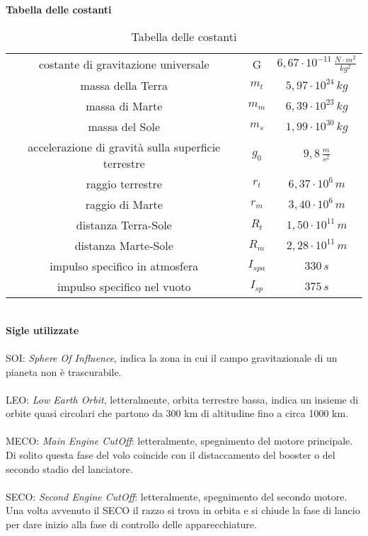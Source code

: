 \textbf{\huge Tabella delle costanti}\\
\begin{table}[h!]
    \centering
    \begin{tabular}{c|c|c}
        \hline
        costante di gravitazione universale & G & $6,67 \cdot 10^{-11}\,\frac{N \cdot m^2}{kg^2}$\\
        massa della Terra & $m_t$ & $5,97 \cdot 10^{24}\,kg$\\
        massa di Marte & $m_m$ & $6,39 \cdot 10^{23}\,kg$ \\
        massa del Sole & $m_s$ & $ 1,99 \cdot 10^{30}\, kg$ \\
        accelerazione di gravità sulla superficie terrestre & $g_0$ & $9,8\,\frac{m}{s^2}$ \\
        raggio terrestre & $r_t$ & $6,37 \cdot 10^6 \, m$ \\
        raggio di Marte & $r_m$ & $3,40 \cdot 10^{6} \, m$ \\
        distanza Terra-Sole & $R_t$ & $1,50 \cdot 10^{11}\, m$ \\
        distanza Marte-Sole & $R_m$ & $2,28 \cdot 10^{11}\, m$ \\
        impulso specifico in atmosfera & $I_{spa}$ & $330\,s$ \\
        impulso specifico nel vuoto & $I_{sp}$ & $375\,s$ \\
        \hline
    \end{tabular}
    \caption{Tabella delle costanti}
    \label{tabella costanti}
\end{table}
\\
\textbf{\huge Sigle utilizzate}\\
\\
SOI: \textit{Sphere Of Influence}, indica la zona in cui il campo gravitazionale di un pianeta non è trascurabile.\\
\\
LEO: \textit{Low Earth Orbit}, letteralmente, orbita terrestre bassa, indica un insieme di orbite quasi circolari che partono da 300 km di altitudine fino a circa 1000 km.\\
\\
MECO: \textit{Main Engine CutOff}: letteralmente, spegnimento del motore principale. Di solito questa fase del volo coincide con il distaccamento del booster o del secondo stadio del lanciatore.\\
\\
SECO: \textit{Second Engine CutOff}: letteralmente, spegnimento del secondo motore. Una volta avvenuto il SECO il razzo si trova in orbita e si chiude la fase di lancio per dare inizio alla fase di controllo delle apparecchiature.